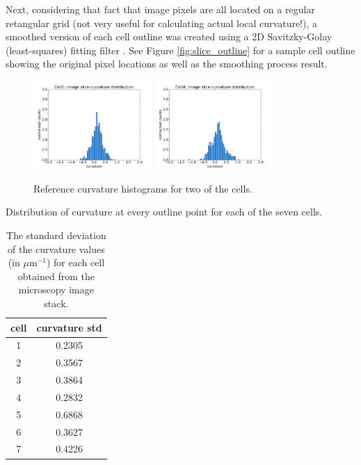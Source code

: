 \documentclass[a4paper,10pt]{article}
\begin{document}
Next, considering that fact that image pixels are all located on a regular retangular grid (not very useful for calculating actual local curvature!), a smoothed version of each cell outline was created using a 2D Savitzky-Golay (least-squares) fitting filter \cite{doi:10.1021/ac60214a047}. See Figure \ref{fig:slice_outline} for a sample cell outline showing the original pixel locations as well as the smoothing process result.\\

\begin{figure}[H]
\begin{center}
\includegraphics[width=0.4\textwidth]{images/cell1_curv.pdf}
\includegraphics[width=0.4\textwidth]{images/cell4_curv.pdf}
\end{center}
\caption{Reference curvature histograms for two of the cells.}
\label{fig:ref_histogram}
\end{figure}

Distribution of curvature at every outline point for each of the seven cells.\\

\begin{table}[H]
\begin{center}
\footnotesize
\begin{tabular}{|c|c|}
\hline
cell &curvature std\\
\hline
1 &0.2305\\
2 &0.3567\\
3 & 0.3864\\
4 &0.2832\\
5 &0.6868\\
6 &0.3627\\
7 & 0.4226\\
\hline
\end{tabular}
\end{center}
\caption{The standard deviation of the curvature values (in $\mu \text{m}^{-1}$) for each cell obtained from the microscopy image stack.}
\label{tab:ref_curv}
\end{table}
\end{document}
